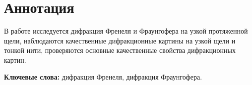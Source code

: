 \section*{Аннотация}

В работе исследуется дифракция Френеля и Фраунгофера на узкой 
протяженной щели, наблюдаются качественные дифракционные 
картины на узкой щели и тонкой нити, проверяются основные 
качественные свойства дифракционных картин.

\textbf{Ключевые слова:} дифракция Френеля, дифракция Фраунгофера.
